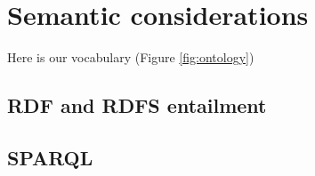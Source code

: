 \documentclass[runningheads,a4paper]{../../StyleFiles/llncs}
\begin{document}
\section{Semantic considerations}
Here is our vocabulary (Figure \ref{fig:ontology})

\subsection{RDF and RDFS entailment}


\subsection{SPARQL}
\end{document}
